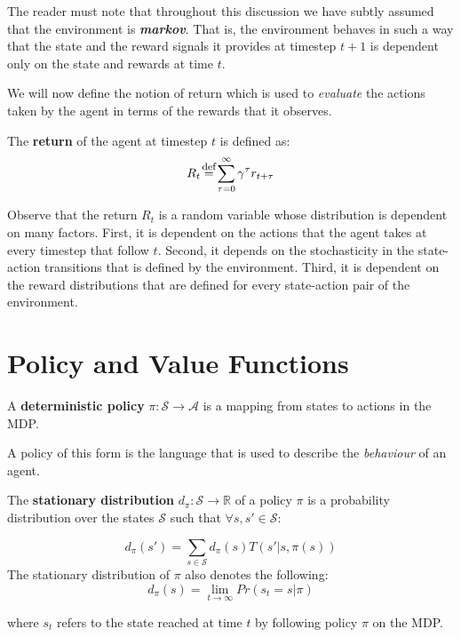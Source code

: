 The reader must note that throughout this discussion we have subtly assumed that the environment is \textbf{\textit{markov}}. That is, the environment behaves in such  a way that the state and the reward signals it provides at timestep $t+1$ is dependent only on the state and rewards at time $t$. 

We will now define the notion of return which is used to \textit{evaluate} the actions taken by the agent in terms of the rewards that it observes. 



\begin{dfn}
The \textbf{return} of the agent at timestep $t$ is defined as:
\[
R_t \defeq \displaystyle\sum\limits_{\tau = 0}^{\infty} \gamma^{\tau} r_{t+\tau}
\]
\end{dfn}

Observe that the return $R_t$ is a random variable whose distribution is dependent on many factors. First, it is dependent on the actions that the agent takes at every timestep that follow $t$. Second, it depends on the stochasticity in the state-action transitions that is defined by the environment. Third, it is dependent on the reward distributions that are defined for every state-action pair of the environment. 


\section{Policy and Value Functions}
\begin{dfn}
A \textbf{deterministic policy} $\pi: \mathcal{S} \to \mathcal{A}$ is a mapping from states to actions in the MDP. 
\end{dfn}

A policy of this form is the language that is used to describe the \textit{behaviour} of an agent. 


\begin{dfn}
The \textbf{stationary distribution} $d_{\pi}: \mathcal{S} \to \mathbb{R}$ of a policy $\pi$ is a probability distribution over the states $\mathcal{S}$ such that $\forall s, s' \in \mathcal{S}$:

\begin{equation}
		d_{\pi}(s') =  \sum_{s \in \mathcal{S}} d_{\pi}(s)T(s' | s,\pi(s))
\end{equation}
The stationary distribution of $\pi$ also denotes the following:
\begin{equation}
		d_{\pi}(s) = \lim\limits_{t \to \infty} Pr(s_t = s | \pi)
\end{equation}

where $s_t$ refers to the state reached at time $t$ by following policy $\pi$ on the MDP.
\end{dfn}



